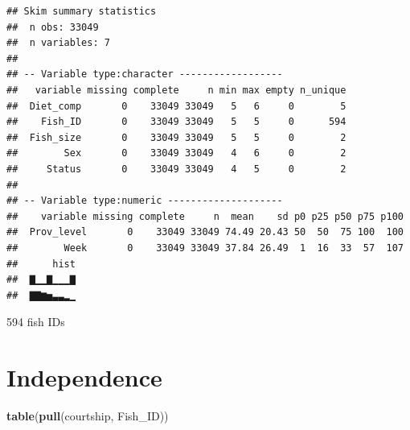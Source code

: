 \documentclass[]{book}
\newenvironment{Shaded}{\begin{snugshade}}{\end{snugshade}}
\newcommand{\KeywordTok}[1]{\textcolor[rgb]{0.13,0.29,0.53}{\textbf{#1}}}
\newcommand{\NormalTok}[1]{#1}
\begin{document}
\begin{verbatim}
## Skim summary statistics
##  n obs: 33049 
##  n variables: 7 
## 
## -- Variable type:character ------------------
##   variable missing complete     n min max empty n_unique
##  Diet_comp       0    33049 33049   5   6     0        5
##    Fish_ID       0    33049 33049   5   5     0      594
##  Fish_size       0    33049 33049   5   5     0        2
##        Sex       0    33049 33049   4   6     0        2
##     Status       0    33049 33049   4   5     0        2
## 
## -- Variable type:numeric --------------------
##    variable missing complete     n  mean    sd p0 p25 p50 p75 p100
##  Prov_level       0    33049 33049 74.49 20.43 50  50  75 100  100
##        Week       0    33049 33049 37.84 26.49  1  16  33  57  107
##      hist
##  ▇▁▁▇▁▁▁▇
##  ▇▇▆▅▃▃▂▁
\end{verbatim}

594 fish IDs

\hypertarget{independence}{%
\section{Independence}\label{independence}}

\begin{Shaded}
\begin{Highlighting}[]
\KeywordTok{table}\NormalTok{(}\KeywordTok{pull}\NormalTok{(courtship, Fish_ID))}
\end{Highlighting}
\end{Shaded}
\end{document}
